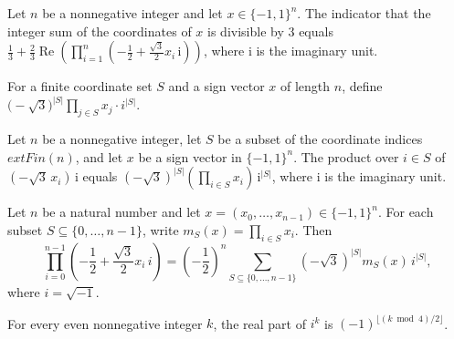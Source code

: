 \begin{theorem}
\label{FABL.modThree_eq_cubicRootFilter}
\leanok
{}
Let $n$ be a nonnegative integer and let $x\in\{-1,1\}^n$. The indicator that the
integer sum of the coordinates of $x$ is divisible by $3$ equals
$\frac13+\frac23\operatorname{Re}\left(\prod_{i=1}^n\left(-\frac12+\frac{\sqrt3}{2}x_i\,\mathrm{i}\right)\right)$,
where $\mathrm{i}$ is the imaginary unit.
\end{theorem}

\begin{definition}
\label{FABL.modThreeComplexTerm}
\leanok
{}
For a finite coordinate set $S$ and a sign vector $x$ of length $n$, define
$\bigl(-\sqrt{3}\bigr)^{|S|}\prod_{j\in S}x_j\cdot i^{|S|}$.
\end{definition}

\begin{theorem}
\label{FABL.modThreeCubicVariableProduct}
\leanok
{}
Let $n$ be a nonnegative integer, let $S$ be a subset of the coordinate indices
$	ext{Fin}(n)$, and let $x$ be a sign vector in $\{-1,1\}^n$. The product over $i\in
S$ of $(-\sqrt{3}\,x_i)\,\mathrm{i}$ equals $(-\sqrt{3})^{|S|}(\prod_{i\in
S}x_i)\,\mathrm{i}^{|S|}$, where $\mathrm{i}$ is the imaginary unit.
\end{theorem}

\begin{theorem}
\label{FABL.modThreeCubicProduct_expansion}
\leanok
{}
Let $n$ be a natural number and let $x=(x_0,\ldots,x_{n-1})\in\{−1,1\}^n$. For each
subset $S\subseteq\{0,\ldots,n-1\}$, write $m_S(x)=\prod_{i\in S}x_i$. Then
\[\prod_{i=0}^{n-1}\left(-\frac12+\frac{\sqrt3}{2}x_i\,i\right)=\left(-\frac12\right)^n\sum_{S\subseteq\{0,\ldots,n-1\}}(-\sqrt3)^{|S|}m_S(x)\,i^{|S|},\]
where $i=\sqrt{-1}$.
\end{theorem}

\begin{theorem}
\label{FABL.re_I_pow_eq_modFourPhase}
\leanok
{}
For every even nonnegative integer $k$, the real part of $i^k$ is $(-1)^{\lfloor (k\bmod
4)/2\rfloor}$.
\end{theorem}

